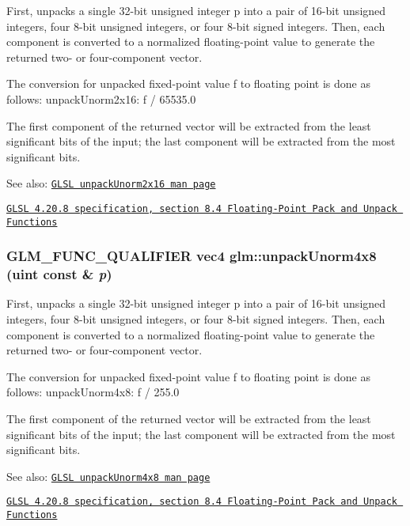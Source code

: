 First, unpacks a single 32-bit unsigned integer p into a pair of 16-bit unsigned integers, four 8-bit unsigned integers, or four 8-bit signed integers. Then, each component is converted to a normalized floating-point value to generate the returned two- or four-component vector.

The conversion for unpacked fixed-point value f to floating point is done as follows: unpackUnorm2x16: f / 65535.0

The first component of the returned vector will be extracted from the least significant bits of the input; the last component will be extracted from the most significant bits.

\begin{Desc}
\item[See also:]\href{http://www.opengl.org/sdk/docs/manglsl/xhtml/unpackUnorm2x16.xml}{\tt GLSL unpackUnorm2x16 man page} 

\href{http://www.opengl.org/registry/doc/GLSLangSpec.4.20.8.pdf}{\tt GLSL 4.20.8 specification, section 8.4 Floating-Point Pack and Unpack Functions} \end{Desc}
\hypertarget{group__core__func__packing_g5d3c4d354b48a317935349dd62a8b8a5}{
\subsubsection[unpackUnorm4x8]{\setlength{\rightskip}{0pt plus 5cm}GLM\_\-FUNC\_\-QUALIFIER vec4 glm::unpackUnorm4x8 (uint const \& {\em p})}}
\label{group__core__func__packing_g5d3c4d354b48a317935349dd62a8b8a5}


First, unpacks a single 32-bit unsigned integer p into a pair of 16-bit unsigned integers, four 8-bit unsigned integers, or four 8-bit signed integers. Then, each component is converted to a normalized floating-point value to generate the returned two- or four-component vector.

The conversion for unpacked fixed-point value f to floating point is done as follows: unpackUnorm4x8: f / 255.0

The first component of the returned vector will be extracted from the least significant bits of the input; the last component will be extracted from the most significant bits.

\begin{Desc}
\item[See also:]\href{http://www.opengl.org/sdk/docs/manglsl/xhtml/unpackUnorm4x8.xml}{\tt GLSL unpackUnorm4x8 man page} 

\href{http://www.opengl.org/registry/doc/GLSLangSpec.4.20.8.pdf}{\tt GLSL 4.20.8 specification, section 8.4 Floating-Point Pack and Unpack Functions} \end{Desc}
